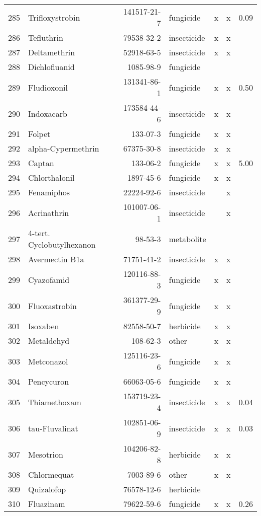 \begin{longtable}{lp{3cm}rlp{0.5cm}p{0.5cm}p{1cm}}
  285 & Trifloxystrobin & 141517-21-7 & fungicide & x & x & 0.09 \\ 
  286 & Tefluthrin & 79538-32-2 & insecticide & x & x &  \\ 
  287 & Deltamethrin & 52918-63-5 & insecticide & x & x &  \\ 
  288 & Dichlofluanid & 1085-98-9 & fungicide &  &  &  \\ 
  289 & Fludioxonil & 131341-86-1 & fungicide & x & x & 0.50 \\ 
  290 & Indoxacarb & 173584-44-6 & insecticide & x & x &  \\ 
  291 & Folpet & 133-07-3 & fungicide & x & x &  \\ 
  292 & alpha-Cypermethrin & 67375-30-8 & insecticide & x & x &  \\ 
  293 & Captan & 133-06-2 & fungicide & x & x & 5.00 \\ 
  294 & Chlorthalonil & 1897-45-6 & fungicide & x & x &  \\ 
  295 & Fenamiphos & 22224-92-6 & insecticide &  & x &  \\ 
  296 & Acrinathrin & 101007-06-1 & insecticide &  & x &  \\ 
  297 & 4-tert. Cyclobutylhexanon & 98-53-3 & metabolite &  &  &  \\ 
  298 & Avermectin B1a & 71751-41-2 & insecticide & x & x &  \\ 
  299 & Cyazofamid & 120116-88-3 & fungicide & x & x &  \\ 
  300 & Fluoxastrobin & 361377-29-9 & fungicide & x & x &  \\ 
  301 & Isoxaben & 82558-50-7 & herbicide & x & x &  \\ 
  302 & Metaldehyd & 108-62-3 & other & x & x &  \\ 
  303 & Metconazol & 125116-23-6 & fungicide & x & x &  \\ 
  304 & Pencycuron & 66063-05-6 & fungicide & x & x &  \\ 
  305 & Thiamethoxam & 153719-23-4 & insecticide & x & x & 0.04 \\ 
  306 & tau-Fluvalinat & 102851-06-9 & insecticide & x & x & 0.03 \\ 
  307 & Mesotrion & 104206-82-8 & herbicide & x & x &  \\ 
  308 & Chlormequat & 7003-89-6 & other & x & x &  \\ 
  309 & Quizalofop & 76578-12-6 & herbicide &  &  &  \\ 
  310 & Fluazinam & 79622-59-6 & fungicide & x & x & 0.26 \\ 

\end{longtable}
